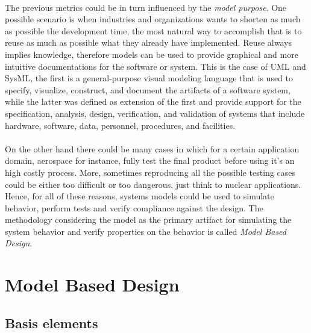 \paragraph{} The previous metrics could be in turn influenced by the \textit{model purpose}. One possible scenario is when industries and organizations wants to shorten as much as possible the development time, the most natural way to accomplish that is to reuse as much as possible what they already have implemented. Reuse always implies knowledge, therefore models can be used to provide graphical and more intuitive documentations for the software or system. This is the case of UML \citep{james1999unified} and SysML\citep{sysml}, the first is a general-purpose visual modeling language that is used to specify, visualize, construct, and document the artifacts of a software system, while the latter was defined as extension of the first and provide support for the specification, analysis, design, verification, and validation of systems that include hardware, software, data, personnel, procedures, and facilities.
\paragraph{} On the other hand there could be many cases in which for a certain application domain, aerospace for instance, fully test the final product before using it's an high costly process. More, sometimes reproducing all the possible testing cases could be either too difficult or too dangerous, just think to nuclear applications. Hence, for all of these reasons, systems models could be used to simulate behavior, perform tests and verify compliance against the design. The methodology considering the model as the primary artifact for simulating the system behavior and verify properties on the behavior is called \textit{Model Based Design}.

\section{Model Based Design}

\subsection{Basis elements}

